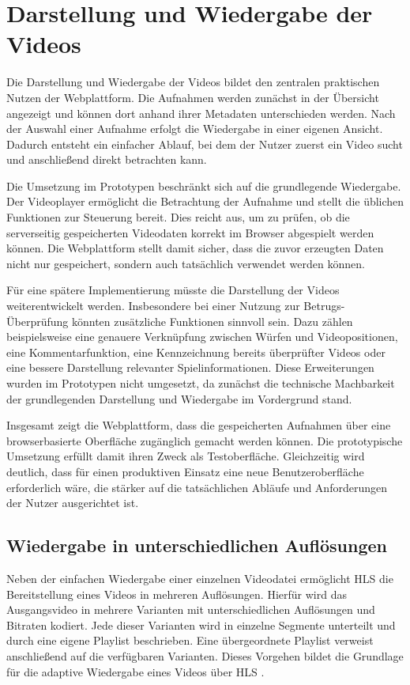 \section{Darstellung und Wiedergabe der Videos} \label{sec:web-darstellung} 

Die Darstellung und Wiedergabe der Videos bildet den zentralen praktischen Nutzen der Webplattform. Die Aufnahmen werden zunächst in der Übersicht angezeigt und können dort anhand ihrer Metadaten unterschieden werden. Nach der Auswahl einer Aufnahme erfolgt die Wiedergabe in einer eigenen Ansicht. 
Dadurch entsteht ein einfacher Ablauf, bei dem der Nutzer zuerst ein Video sucht und anschließend direkt betrachten kann. 

Die Umsetzung im Prototypen beschränkt sich auf die grundlegende Wiedergabe. Der Videoplayer ermöglicht die Betrachtung der Aufnahme und stellt die üblichen Funktionen zur Steuerung bereit. Dies reicht aus, um zu prüfen, ob die serverseitig gespeicherten Videodaten korrekt im Browser abgespielt werden können. 
Die Webplattform stellt damit sicher, dass die zuvor erzeugten Daten nicht nur gespeichert, sondern auch tatsächlich verwendet werden können. 

Für eine spätere Implementierung müsste die Darstellung der Videos weiterentwickelt werden. Insbesondere bei einer Nutzung zur Betrugs-Überprüfung könnten zusätzliche Funktionen sinnvoll sein. Dazu zählen beispielsweise eine genauere Verknüpfung zwischen Würfen und Videopositionen, eine Kommentarfunktion, 
eine Kennzeichnung bereits überprüfter Videos oder eine bessere Darstellung relevanter Spielinformationen. Diese Erweiterungen wurden im Prototypen nicht umgesetzt, da zunächst die technische Machbarkeit der grundlegenden Darstellung und Wiedergabe im Vordergrund stand. 

Insgesamt zeigt die Webplattform, dass die gespeicherten Aufnahmen über eine browserbasierte Oberfläche zugänglich gemacht werden können. Die prototypische Umsetzung erfüllt damit ihren Zweck als Testoberfläche. Gleichzeitig wird deutlich, 
dass für einen produktiven Einsatz eine neue Benutzeroberfläche erforderlich wäre, die stärker auf die tatsächlichen Abläufe und Anforderungen der Nutzer ausgerichtet ist.

\subsection{Wiedergabe in unterschiedlichen Auflösungen} 

Neben der einfachen Wiedergabe einer einzelnen Videodatei ermöglicht HLS die Bereitstellung eines Videos in mehreren Auflösungen. Hierfür wird das Ausgangsvideo in mehrere Varianten mit unterschiedlichen Auflösungen und Bitraten kodiert. 
Jede dieser Varianten wird in einzelne Segmente unterteilt und durch eine eigene Playlist beschrieben. Eine übergeordnete Playlist verweist anschließend auf die verfügbaren Varianten. Dieses Vorgehen bildet die Grundlage für die adaptive Wiedergabe eines Videos über HLS \cite{Saini2026}. 

